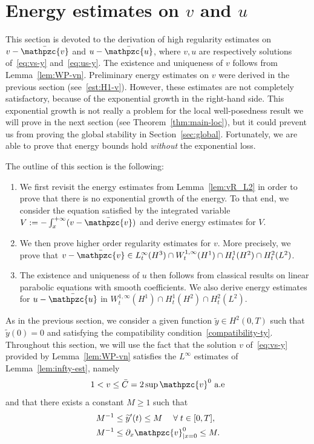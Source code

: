 \documentclass[AHL,Unicode,longabstracts,published]{cedram}
\newcommand{\p}{\partial}
\newcommand{\bv}{\bar{\mathpzc{v}}}
\newcommand{\bu}{\bar{\mathpzc{u}}}
\newcommand{\tv}{\mathpzc{v}}
\newcommand{\ty}{\widetilde{y}}
\let\oldforall\forall
\renewcommand*{\forall}{\mathrel{\oldforall}}
\begin{document}
\section{Energy estimates on \texorpdfstring{$v$}{v} and \texorpdfstring{$u$}{u}}\label{sec:estimates}

This section is devoted to the derivation of high regularity estimates on $v -\bv$ and $u - \bu$, where $v, u$ are respectively solutions of~\eqref{eq:vs-y} and~\eqref{eq:us-y}. The existence and uniqueness of $v$ follows from Lemma~\ref{lem:WP-vn}. Preliminary energy estimates on $v$ were derived in the previous section (see~\eqref{est:H1-v}). However, these estimates are not completely satisfactory, because of the exponential growth in the right-hand side. This exponential growth is not really a problem for the local well-posedness result we will prove in the next section (see Theorem~\ref{thm:main-loc}), but it could prevent us from proving the global stability in Section~\ref{sec:global}. Fortunately, we are able to prove that energy bounds hold \emph{without} the exponential loss.

The outline of this section is the following:
\begin{enumerate}
\item We first revisit the energy estimates from Lemma~\ref{lem:vR_L2} in order to prove that there is no exponential growth of the energy. To that end, we consider the equation satisfied by the integrated variable $V:=-\int_x^{+\infty} (v - \bv)$ and derive energy estimates for $V$.

\item We then prove higher order regularity estimates for $v$. More precisely, we prove that $v-\bv\in L^\infty_t(H^3)\cap W^{1,\infty}_t(H^1)\cap H^1_t(H^2)\cap H^2_t(L^2)$.

\item The existence and uniqueness of $u$ then follows from classical results on linear parabolic equations with smooth coefficients. We also derive energy estimates for $u-\bu$ in $W^{1,\infty}_t(H^1)\cap H^1_t(H^2)\cap H^2_t(L^2)$.
\end{enumerate}

As in the previous section, we consider a given function $\ty\in H^2(0,T)$ such that $\ty(0)=0$ and satisfying the compatibility condition~\eqref{compatibility-ty}. Throughout this section, we will use the fact that the solution $v$ of~\eqref{eq:vs-y} provided by Lemma~\ref{lem:WP-vn} satisfies the $L^\infty$ estimates of Lemma~\ref{lem:infty-est}, namely
\begin{equation}
1< v \leq \bar C=2\sup \tv^0 \text{ a.e}
\end{equation}
and that there exists a constant $M\geq 1$ such that
\begin{equation}\label{hyp:ty-M}
\begin{aligned}
M^{-1} &\leq \ty'(t)\leq M \quad \forall t\in [0,T],\\
M^{-1} &\leq \p_x \tv^0_{|x=0}\leq M.\end{aligned}
\end{equation}
\end{document}
